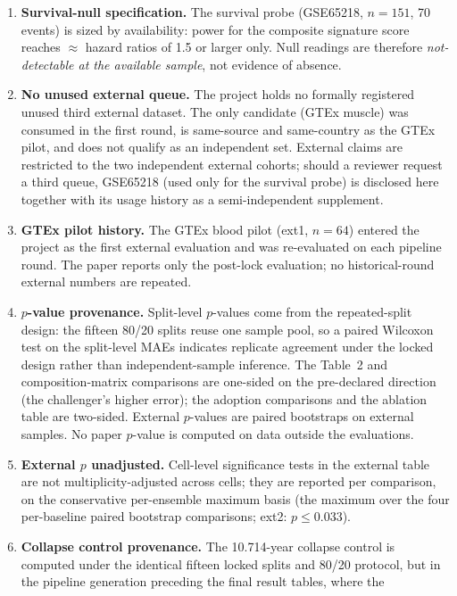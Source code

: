 \documentclass[11pt]{article}
\begin{document}
\begin{enumerate}
directional soft influence of that history on the final menu cannot be
entirely excluded; only the post-lock evaluation is reported in the paper.
\item \textbf{Survival-null specification.} The survival probe (GSE65218,
$n=151$, 70 events) is sized by availability: power for the composite
signature score reaches $\approx$ hazard ratios of 1.5 or larger only. Null
readings are therefore \emph{not-detectable at the available sample}, not
evidence of absence.
\item \textbf{No unused external queue.} The project holds no formally
registered unused third external dataset. The only candidate (GTEx muscle)
was consumed in the first round, is same-source and same-country as the GTEx
pilot, and does not qualify as an independent set. External claims are
restricted to the two independent external cohorts; should a reviewer request a
third queue, GSE65218 (used only for the survival probe) is disclosed here
together with its usage history as a semi-independent supplement.
\item \textbf{GTEx pilot history.} The GTEx blood pilot (ext1, $n=64$) entered
the project as the first external evaluation and was re-evaluated on each
pipeline round. The paper reports only the post-lock evaluation; no
historical-round external numbers are repeated.
\item \textbf{$p$-value provenance.} Split-level $p$-values come from the
repeated-split design: the fifteen 80/20 splits reuse one sample pool, so a
paired Wilcoxon test on the split-level MAEs indicates replicate
agreement under the locked design rather than independent-sample inference.
The Table~2 and composition-matrix comparisons are one-sided on the
pre-declared direction (the challenger's higher error); the adoption
comparisons and the ablation table are two-sided. External $p$-values are
paired bootstraps on external samples. No
paper $p$-value is computed on data outside the evaluations.
\item \textbf{External $p$ unadjusted.} Cell-level significance tests in the
external table are not multiplicity-adjusted across cells; they are reported
per comparison, on the conservative per-ensemble maximum basis (the maximum
over the four per-baseline paired bootstrap comparisons; ext2:
$p\le 0.033$).
\item \textbf{Collapse control provenance.} The 10.714-year collapse control is
computed under the identical fifteen locked splits and 80/20 protocol, but in
the pipeline generation preceding the final result tables, where the

\end{enumerate}
\end{document}
